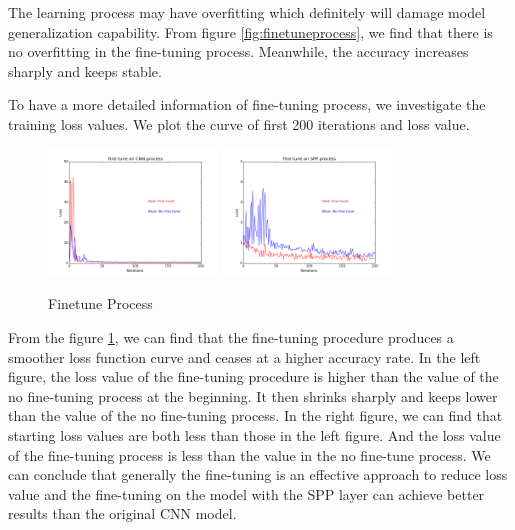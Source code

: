 The learning process may have overfitting which definitely will damage model generalization capability. From figure \ref{fig:finetuneprocess}, we find that there is no overfitting in the fine-tuning process. Meanwhile, the accuracy increases sharply and keeps stable.

To have a more detailed information of fine-tuning process, we investigate the training loss values. We plot the curve of first 200 iterations and loss value.

\begin{figure}[!htb]
    \centering
	\includegraphics[width=0.4\textwidth]{finetuneCNNProcess.png}
	\includegraphics[width=0.4\textwidth]{finetuneSPPProcess.png}
    \caption{Finetune Process}%
    \label{fig:FTvsSC}%
\end{figure}

From the figure \ref{fig:FTvsSC}, we can find that the fine-tuning procedure produces a smoother loss function curve and ceases at a higher accuracy rate. In the left figure, the loss value of the fine-tuning procedure is higher than the value of the no fine-tuning process at the beginning. It then shrinks sharply and keeps lower than the value of the no fine-tuning process. In the right figure, we can find that starting loss values are both less than those in the left figure. And the loss value of the fine-tuning process is less than the value in the no fine-tune process. We can conclude that generally the fine-tuning is an effective approach to reduce loss value and the fine-tuning on the model with the SPP layer can achieve better results than the original CNN model.

